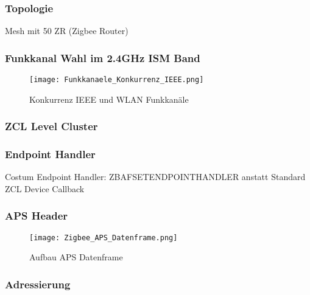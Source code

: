 \subsubsection{Topologie}\label{subsubsec:ZigbeeTopologie}

Mesh mit 50 ZR (Zigbee Router)


\subsubsection{Funkkanal Wahl im 2.4GHz ISM Band}\label{subsubsec:FunkkanalWahlim2.4GHzISMBand}

\begin{figure}[h]
	\centering
	\texttt{[image: Funkkanaele\_Konkurrenz\_IEEE.png]}
	\caption{Konkurrenz IEEE und WLAN Funkkanäle \cite{markus_krause_rainer_konrad_drahtlose_2014}}
	\label{fig:KonkurrenzIEEEundWLANFunkkanäle}
\end{figure}

\subsubsection{ZCL Level Cluster}\label{subsubsec:ZCLLevelCluster}

\subsubsection{Endpoint Handler}\label{subsubsec:EndpointHandler}

Costum Endpoint Handler: ZBAFSETENDPOINTHANDLER anstatt Standard ZCL Device Callback

\subsubsection{APS Header}\label{subsubsec:Header}


\begin{figure}[h]
	\centering
	\texttt{[image: Zigbee\_APS\_Datenframe.png]}
	\caption{Aufbau APS Datenframe \cite{markus_krause_rainer_konrad_drahtlose_2014}}
	\label{fig:KonkurrenzIEEEundWLANFunkkanäle}
\end{figure}


\subsubsection{Adressierung}\label{subsubsec:Adressierung}

